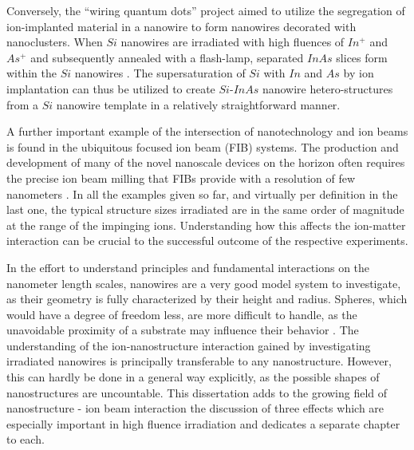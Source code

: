 Conversely, the ``wiring quantum dots'' project aimed to utilize the segregation of ion-implanted material in a nanowire to form nanowires decorated with nanoclusters. When $Si$ nanowires are irradiated with high fluences of $In^+$ and $As^+$ and subsequently annealed with a flash-lamp, separated $InAs$ slices form within the $Si$ nanowires \cite{prucnal_iii-v_2014,glaser_personal_2015}. The supersaturation of $Si$ with $In$ and $As$ by ion implantation can thus be utilized to create $Si$-$InAs$ nanowire hetero-structures from a $Si$ nanowire template in a relatively straightforward manner.
 
A further important example of the intersection of nanotechnology and ion beams is found in the ubiquitous focused ion beam (FIB) systems. The production and development of many of the novel nanoscale devices on the horizon often requires the precise ion beam milling that FIBs provide with a resolution of few nanometers \cite{kranz_integrating_2001,george_nanopore_2010,chalapat_self-organized_2013}. In all the examples given so far, and virtually per definition in the last one, the typical structure sizes irradiated are in the same order of magnitude at the range of the impinging ions. Understanding how this affects the ion-matter interaction can be crucial to the successful outcome of the respective experiments.

In the effort to understand principles and fundamental interactions on the nanometer length scales, nanowires are a very good model system to investigate, as their geometry is fully characterized by their height and radius. Spheres, which would have a degree of freedom less, are more difficult to handle, as the unavoidable proximity of a substrate may influence their behavior \cite{hu_burrowing_2002,klimmer_size-dependent_2009,moller_tri3dyn_2014,johannes_ion_2015}. The understanding of the ion-nanostructure interaction gained by investigating irradiated nanowires is principally transferable to any nanostructure. However, this can hardly be done in a general way explicitly, as the possible shapes of nanostructures are uncountable. This dissertation adds to the growing field of nanostructure - ion beam interaction the discussion of three effects which are especially important in high fluence irradiation and dedicates a separate chapter to each. 
 
